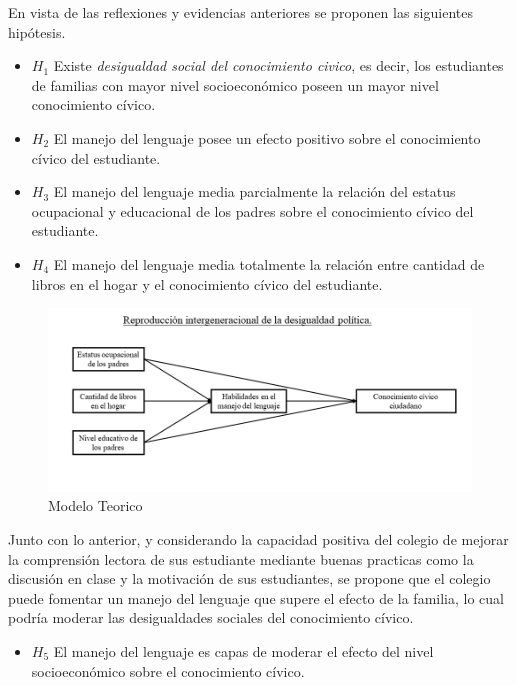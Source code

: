 \documentclass[12pt,twoside]{templates/facsothesis}
\providecommand{\tightlist}{%
  \setlength{\itemsep}{0pt}\setlength{\parskip}{0pt}}
\begin{document}
En vista de las reflexiones y evidencias anteriores se proponen las siguientes hipótesis.

\begin{itemize}
\item
  \(H_1\) Existe \emph{desigualdad social del conocimiento civico}, es decir, los estudiantes de familias con mayor nivel socioeconómico poseen un mayor nivel conocimiento cívico.
\item
  \(H_2\) El manejo del lenguaje posee un efecto positivo sobre el conocimiento cívico del estudiante.
\item
  \(H_3\) El manejo del lenguaje media parcialmente la relación del estatus ocupacional y educacional de los padres sobre el conocimiento cívico del estudiante.
\item
  \(H_4\) El manejo del lenguaje media totalmente la relación entre cantidad de libros en el hogar y el conocimiento cívico del estudiante.
\end{itemize}

\begin{figure}

{\centering \includegraphics[width=0.95\linewidth]{images/modelo} 

}

\caption{Modelo Teorico}\label{fig:unnamed-chunk-2}
\end{figure}

Junto con lo anterior, y considerando la capacidad positiva del colegio de mejorar la comprensión lectora de sus estudiante mediante buenas practicas como la discusión en clase y la motivación de sus estudiantes, se propone que el colegio puede fomentar un manejo del lenguaje que supere el efecto de la familia, lo cual podría moderar las desigualdades sociales del conocimiento cívico.

\begin{itemize}
\tightlist
\item
  \(H_5\) El manejo del lenguaje es capas de moderar el efecto del nivel socioeconómico sobre el conocimiento cívico.
\end{itemize}
\end{document}
